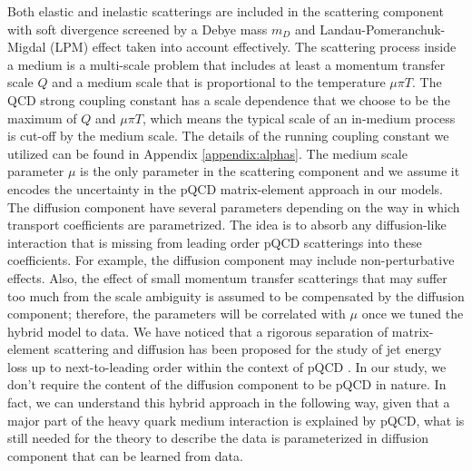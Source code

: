 \documentclass[aps, prc, reprint, amsmath, groupedaddress, nofootinbib]{revtex4-1}
\begin{document}
Both elastic and inelastic scatterings are included in the scattering component with soft divergence screened by a Debye mass $m_D$ and Landau-Pomeranchuk-Migdal (LPM) effect taken into account effectively.
The scattering process inside a medium is a multi-scale problem that includes at least a momentum transfer scale $Q$ and a medium scale that is proportional to the temperature $\mu\pi T$.
The QCD strong coupling constant has a scale dependence that we choose to be the maximum of $Q$ and $\mu\pi T$, which means the typical scale of an in-medium process is cut-off by the medium scale.
The details of the running coupling constant we utilized can be found in Appendix \ref{appendix:alphas}.
The medium scale parameter $\mu$ is the only parameter in the scattering component and we assume it encodes the uncertainty in the pQCD matrix-element approach in our models.
The diffusion component have several parameters depending on the way in which transport coefficients are parametrized. 
The idea is to absorb any diffusion-like interaction that is missing from leading order pQCD scatterings into these coefficients.
For example, the diffusion component may include non-perturbative effects.
Also, the effect of small momentum transfer scatterings that may suffer too much from the scale ambiguity is assumed to be compensated by the diffusion component; therefore, the parameters will be correlated with $\mu$ once we tuned the hybrid model to data.
We have noticed that a rigorous separation of matrix-element scattering and diffusion has been proposed for the study of jet energy loss up to next-to-leading order within the context of pQCD \cite{Ghiglieri:2015ala}.
In our study, we don't require the content of the diffusion component to be pQCD in nature.
In fact, we can understand this hybrid approach in the following way, given that a major part of the heavy quark medium interaction is explained by pQCD, what is still needed for the theory to describe the data is parameterized in diffusion component that can be learned from data.
\end{document}
